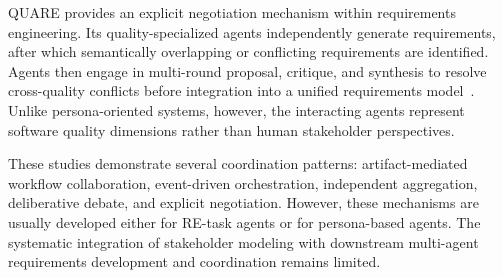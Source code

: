 QUARE provides an explicit negotiation mechanism within requirements engineering. Its quality-specialized agents independently generate requirements, after which semantically overlapping or conflicting requirements are identified. Agents then engage in multi-round proposal, critique, and synthesis to resolve cross-quality conflicts before integration into a unified requirements model~\cite{cheng2026quare}. Unlike persona-oriented systems, however, the interacting agents represent software quality dimensions rather than human stakeholder perspectives.

These studies demonstrate several coordination patterns: artifact-mediated workflow collaboration, event-driven orchestration, independent aggregation, deliberative debate, and explicit negotiation. However, these mechanisms are usually developed either for RE-task agents or for persona-based agents. The systematic integration of stakeholder modeling with downstream multi-agent requirements development and coordination remains limited.
